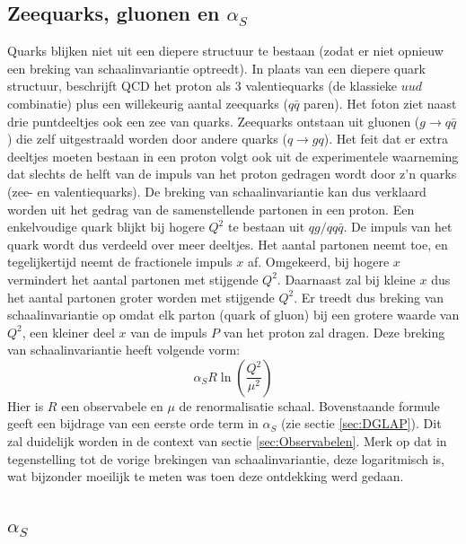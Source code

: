 \documentclass[a4paper,11pt]{article}
\numberwithin{equation}{section} %
\begin{document}
  \subsection{Zeequarks, gluonen en $\alpha_S$}
Quarks blijken niet uit een diepere structuur te bestaan (zodat er niet opnieuw een breking van schaalinvariantie optreedt).
In plaats van een diepere quark structuur, beschrijft QCD het proton als 3 valentiequarks (de klassieke $u u d$ combinatie) plus een willekeurig aantal zeequarks ($q\bar{q}$ paren).
Het foton ziet naast drie puntdeeltjes ook een zee van quarks.
Zeequarks ontstaan uit gluonen ($g\rightarrow q\bar{q}$) die zelf uitgestraald worden door andere quarks ($q\rightarrow gq$).
Het feit dat er extra deeltjes moeten bestaan in een proton volgt ook uit de experimentele waarneming dat slechts de helft van de impuls van het proton gedragen wordt door z’n quarks (zee- en valentiequarks).
De breking van schaalinvariantie kan dus verklaard worden uit het gedrag van de samenstellende partonen in een proton.
Een enkelvoudige quark blijkt bij hogere $Q^2$ te bestaan uit $q g/q q\bar{q}$.
De impuls van het quark wordt dus verdeeld over meer deeltjes.
Het aantal partonen neemt toe, en tegelijkertijd neemt de fractionele impuls $x$ af.
Omgekeerd, bij hogere $x$ vermindert het aantal partonen met stijgende $Q^2$.
Daarnaast zal bij kleine $x$ dus het aantal partonen groter worden met stijgende $Q^2$.
Er treedt dus breking van schaalinvariantie op omdat elk parton (quark of gluon) bij een grotere waarde van $Q^2$, een kleiner deel  $x$ van de impuls $P$ van het proton zal dragen.
Deze breking van schaalinvariantie heeft volgende vorm:
\begin{equation}
\alpha_S R \ln{\left( \frac{Q^2}{\mu^2}\right)}
\end{equation}
Hier is $R$ een observabele en $\mu$ de renormalisatie schaal.
Bovenstaande formule geeft een bijdrage van een eerste orde term in $\alpha_S$ (zie sectie \ref{sec:DGLAP}).
Dit zal duidelijk worden in de context van sectie \ref{sec:Observabelen}.
Merk op dat in tegenstelling tot de vorige brekingen van schaalinvariantie, deze logaritmisch is, wat bijzonder moeilijk te meten was toen deze ontdekking werd gedaan.

  \subsection{$\alpha_S$}
\end{document}
